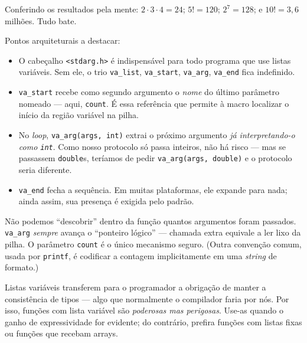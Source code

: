 \documentclass[11pt,a4paper]{article}
\begin{document}
Conferindo os resultados pela mente: $2 \cdot 3 \cdot 4 = 24$; $5! = 120$; $2^{7} = 128$; e $10! = 3{,}6$ milh\~oes. Tudo bate.

Pontos arquiteturais a destacar:

\begin{itemize}[leftmargin=*]
  \item O cabe\c{c}alho \texttt{<stdarg.h>} \'e indispens\'avel para todo programa que use listas vari\'aveis. Sem ele, o trio \texttt{va\_list}, \texttt{va\_start}, \texttt{va\_arg}, \texttt{va\_end} fica indefinido.
  \item \texttt{va\_start} recebe como segundo argumento o \emph{nome} do \'ultimo par\^ametro nomeado --- aqui, \texttt{count}. \'E essa refer\^encia que permite \`a macro localizar o in\'icio da regi\~ao vari\'avel na pilha.
  \item No \emph{loop}, \texttt{va\_arg(args, int)} extrai o pr\'oximo argumento \emph{j\'a interpretando-o como \texttt{int}}. Como nosso protocolo s\'o passa inteiros, n\~ao h\'a risco --- mas se passassem \texttt{double}s, ter\'iamos de pedir \texttt{va\_arg(args, double)} e o protocolo seria diferente.
  \item \texttt{va\_end} fecha a sequ\^encia. Em muitas plataformas, ele expande para nada; ainda assim, sua presen\c{c}a \'e exigida pelo padr\~ao.
\end{itemize}

\begin{errocomum}
N\~ao podemos ``descobrir'' dentro da fun\c{c}\~ao quantos argumentos foram passados. \texttt{va\_arg} \emph{sempre} avan\c{c}a o ``ponteiro l\'ogico'' --- chamada extra equivale a ler lixo da pilha. O par\^ametro \texttt{count} \'e o \'unico mecanismo seguro. (Outra conven\c{c}\~ao comum, usada por \texttt{printf}, \'e codificar a contagem implicitamente em uma \emph{string} de formato.)
\end{errocomum}

\begin{obseng}
Listas vari\'aveis transferem para o programador a obriga\c{c}\~ao de manter a consist\^encia de tipos --- algo que normalmente o compilador faria por n\'os. Por isso, fun\c{c}\~oes com lista vari\'avel s\~ao \emph{poderosas mas perigosas}. Use-as quando o ganho de expressividade for evidente; do contr\'ario, prefira fun\c{c}\~oes com listas fixas ou fun\c{c}\~oes que recebam arrays.
\end{obseng}

\end{document}

